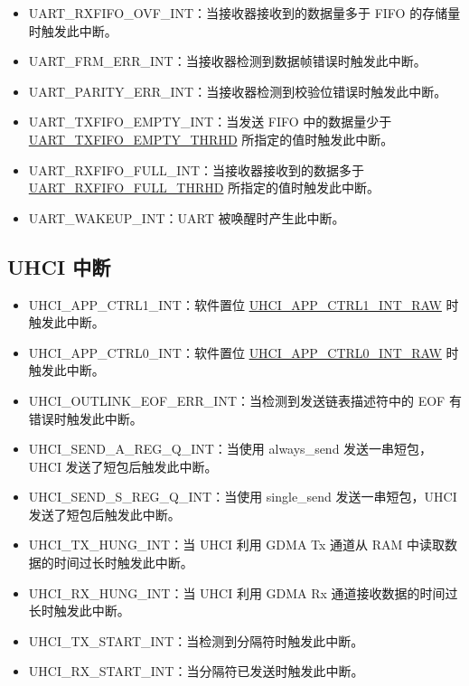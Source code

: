 \documentclass[main\_\_CN.tex]{subfiles}
\begin{document}
\begin{itemize}
\item \label{int:UARTRXFIFOOVFINT}UART\_RXFIFO\_OVF\_INT：当接收器接收到的数据量多于 FIFO 的存储量时触发此中断。
\item \label{int:UARTFRMERRINT}UART\_FRM\_ERR\_INT：当接收器检测到数据帧错误时触发此中断。 
\item \label{int:UARTPARITYERRINT}UART\_PARITY\_ERR\_INT：当接收器检测到校验位错误时触发此中断。
\item \label{int:UARTTXFIFOEMPTYINT}UART\_TXFIFO\_EMPTY\_INT：当发送 FIFO 中的数据量少于 \hyperref[fielddesc:UARTTXFIFOEMPTYTHRHD]{UART\_TXFIFO\_EMPTY\_THRHD} 所指定的值时触发此中断。
\item \label{int:UARTRXFIFOFULLINT}UART\_RXFIFO\_FULL\_INT：当接收器接收到的数据多于 \hyperref[fielddesc:UARTRXFIFOFULLTHRHD]{UART\_RXFIFO\_FULL\_THRHD} 所指定的值时触发此中断。
\item \label{int:UARTWAKEUPINT}UART\_WAKEUP\_INT：UART 被唤醒时产生此中断。
\end{itemize}

\subsection{UHCI 中断}
\begin{itemize}
\item \label{int:UHCIAPPCTRL1INT}UHCI\_APP\_CTRL1\_INT：软件置位 \hyperref[fielddesc:UHCIAPPCTRL1INTRAW]{UHCI\_APP\_CTRL1\_INT\_RAW} 时触发此中断。
\item \label{int:UHCIAPPCTRL0INT}UHCI\_APP\_CTRL0\_INT：软件置位 \hyperref[fielddesc:UHCIAPPCTRL0INTRAW]{UHCI\_APP\_CTRL0\_INT\_RAW} 时触发此中断。
\item \label{int:UHCIOUTLINKEOFERRINT}UHCI\_OUTLINK\_EOF\_ERR\_INT：当检测到发送链表描述符中的 EOF 有错误时触发此中断。
\item \label{int:UHCISENDAREGQINT}UHCI\_SEND\_A\_REG\_Q\_INT：当使用 always\_send 发送一串短包，UHCI 发送了短包后触发此中断。
\item \label{int:UHCISENDSREGQINT}UHCI\_SEND\_S\_REG\_Q\_INT：当使用 single\_send 发送一串短包，UHCI 发送了短包后触发此中断。
\item \label{int:UHCITXHUNGINT}UHCI\_TX\_HUNG\_INT：当 UHCI 利用 GDMA Tx 通道从 RAM 中读取数据的时间过长时触发此中断。
\item \label{int:UHCIRXHUNGINT}UHCI\_RX\_HUNG\_INT：当 UHCI 利用 GDMA Rx 通道接收数据的时间过长时触发此中断。
\item \label{int:UHCITXSTARTINT}UHCI\_TX\_START\_INT：当检测到分隔符时触发此中断。
\item \label{int:UHCIRXSTARTINT}UHCI\_RX\_START\_INT：当分隔符已发送时触发此中断。
\end{itemize}
\end{document}
